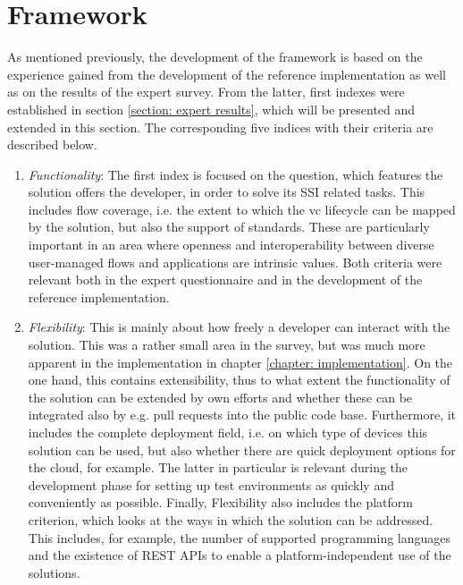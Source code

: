 	\section{Framework}
	
    As mentioned previously, the development of the framework is based on the experience gained from the development of the reference implementation as well as on the results of the expert survey. From the latter, first indexes were established in section \ref{section: expert results}, which will be presented and extended in this section. The corresponding five indices with their criteria are described below.
    
    \begin{enumerate}
        \item \textit{Functionality}: The first index is focused on the question, which features the solution offers the developer, in order to solve its \ac{SSI} related tasks. This includes flow coverage, i.e. the extent to which the \ac{vc} lifecycle can be mapped by the solution, but also the support of standards. These are particularly important in an area where openness and interoperability between diverse user-managed flows and applications are intrinsic values. Both criteria were relevant both in the expert questionnaire and in the development of the reference implementation.
        \item \textit{Flexibility}: This is mainly about how freely a developer can interact with the solution. This was a rather small area in the survey, but was much more apparent in the implementation in chapter \ref{chapter: implementation}. On the one hand, this contains extensibility, thus to what extent the functionality of the solution can be extended by own efforts and whether these can be integrated also by e.g. pull requests into the public code base. Furthermore, it includes the complete deployment field, i.e. on which type of devices this solution can be used, but also whether there are quick deployment options for the cloud, for example. The latter in particular is relevant during the development phase for setting up test environments as quickly and conveniently as possible. Finally, Flexibility also includes the platform criterion, which looks at the ways in which the solution can be addressed. This includes, for example, the number of supported programming languages and the existence of REST APIs to enable a platform-independent use of the solutions.

\end{enumerate}
